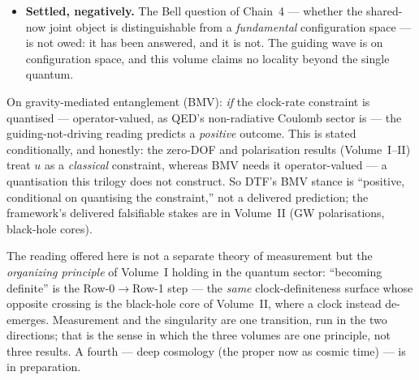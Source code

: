 \documentclass[11pt]{article}
\begin{document}
\begin{tcolorbox}[keybox]
\begin{itemize}[leftmargin=1.4em,itemsep=2pt,topsep=3pt]
    imported. For its origin DTF offers a \emph{candidate}, not a derivation --- the clock's cell-to-cell
    resynchronisation, whose fluctuation is a natural source for the diffusion the amplitude law needs ---
    at a scale $\hbar$ posited as every formulation of quantum mechanics posits it; what is open is whether
    that dynamics \emph{forces} the coefficient $\hbar/2m$ (the factor of $2$). DTF therefore \emph{reduces}
    the Schr\"odinger equation to one posited constant plus one open coefficient; it does not derive it.
    \emph{On single-valuedness, two open items, honestly sized:} (i)~that the Row-0$\to$Row-1 emergence
    through the $u$-clock is a conditioning-type map (which would preserve single-valuedness), still to be
    shown for the specific $u$-clock emergence; and (ii)~the nodal / multiply-connected case, genuinely
    open, because there the single-valuedness posit is a real restriction (spinors, anyons). These are
    smaller than ``Wallstrom is unaddressed'' --- the obstruction is reduced to one declared posit --- but
    larger than a single technical residual.
  \item \textbf{Settled, negatively.} The Bell question of Chain~4 --- whether the shared-now joint object
    is distinguishable from a \emph{fundamental} configuration space --- is not owed: it has
    been answered, and it is not. The guiding wave is on configuration space, and this volume claims no
    locality beyond the single quantum.
\end{itemize}
\end{tcolorbox}

\noindent On gravity-mediated entanglement (BMV): \emph{if} the clock-rate constraint is quantised ---
operator-valued, as QED's non-radiative Coulomb sector is --- the guiding-not-driving reading predicts a
\emph{positive} outcome. This is stated conditionally, and honestly: the zero-DOF and polarisation
results (Volume~I--II) treat $u$ as a \emph{classical} constraint, whereas BMV needs it operator-valued
--- a quantisation this trilogy does not construct. So DTF's BMV stance is ``positive, conditional on
quantising the constraint,'' not a delivered prediction; the framework's delivered falsifiable stakes are
in Volume~II (GW polarisations, black-hole cores).

\medskip
\noindent The reading offered here is not a separate theory of measurement but the \emph{organizing
principle} of Volume~I holding in the quantum sector: ``becoming definite'' is the Row-0$\to$Row-1 step ---
the \emph{same} clock-definiteness surface whose opposite crossing is the black-hole core of Volume~II,
where a clock instead de-emerges. Measurement and the singularity are one transition, run in the two
directions; that is the sense in which the three volumes are one principle, not three results. A fourth ---
deep cosmology (the proper now as cosmic time) --- is in preparation.
\end{document}
